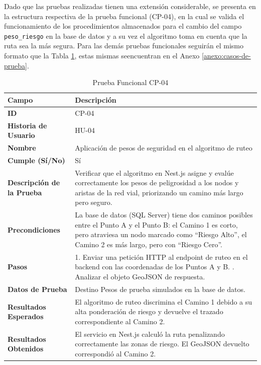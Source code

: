 Dado que las pruebas realizadas tienen una extensión considerable, se presenta en la estructura respectiva de la prueba funcional (CP-04), en la cual se valida el funcionamiento de los procedimientos almacenados para el cambio del campo \texttt{peso\_riesgo} en la base de datos y a su vez el algoritmo toma en cuenta que la ruta sea la más segura. Para las demás pruebas funcionales seguirán el mismo formato que la Tabla \ref{tab:prueba04}, estas mismas seencuentran en el Anexo \ref{anexo:casos-de-prueba}.
\begin{longtable}{|p{4cm}|p{10cm}|}
\caption{Prueba Funcional CP-04}\label{tab:prueba04}\\
\hline
\textbf{Campo} & \textbf{Descripción} \\ \hline

\textbf{ID} & CP-04 \\ \hline

\textbf{Historia de Usuario} & HU-04 \\ \hline

\textbf{Nombre} & Aplicación de pesos de seguridad en el algoritmo de ruteo \\ \hline

\textbf{Cumple (Sí/No)} & Sí \\ \hline

\textbf{Descripción de la Prueba} &
Verificar que el algoritmo en Nest.js asigne y evalúe correctamente los pesos de peligrosidad a los nodos y aristas de la red vial, priorizando un camino más largo pero seguro. \\ \hline

\textbf{Precondiciones} &
La base de datos (SQL Server) tiene dos caminos posibles entre el Punto A y el Punto B: el Camino 1 es corto, pero atraviesa un nodo marcado como ``Riesgo Alto'', el Camino 2 es más largo, pero con ``Riesgo Cero''. \\ \hline

\textbf{Pasos} &
1. Enviar una petición HTTP al endpoint de ruteo en el backend con las coordenadas de los Puntos A y B. \newline
2. Analizar el objeto GeoJSON de respuesta. \\ \hline

\textbf{Datos de Prueba} &
Destino \newline
Pesos de prueba simulados en la base de datos. \\ \hline

\textbf{Resultados Esperados} &
El algoritmo de ruteo discrimina el Camino 1 debido a su alta ponderación de riesgo y devuelve el trazado correspondiente al Camino 2. \\ \hline

\textbf{Resultados Obtenidos} &
El servicio en Nest.js calculó la ruta penalizando correctamente las zonas de riesgo. El GeoJSON devuelto correspondió al Camino 2. \\ \hline

\end{longtable}

